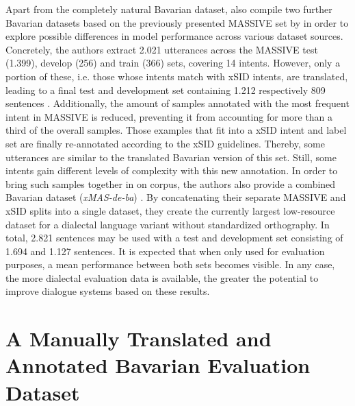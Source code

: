 \documentclass[11pt,a4paper,twoside,openright]{scrbook}
\begin{document}
Apart from the completely natural Bavarian dataset, \citet{winkler-etal-2024-slot-intent} also compile two further Bavarian datasets based on the previously presented MASSIVE set by \citet{fitzgerald-etal-2023-massive} in order to explore possible differences in model performance across various dataset sources. Concretely, the authors extract 2.021 utterances across the MASSIVE test (1.399), develop (256) and train (366) sets, covering 14 intents. However, only a portion of these, i.e. those whose intents match with xSID intents, are translated, leading to a final test and development set containing 1.212 respectively 809 sentences \citep{winkler-etal-2024-slot-intent}. Additionally, the amount of samples annotated with the most frequent intent in MASSIVE is reduced, preventing it from accounting for more than a third of the overall samples. Those examples that fit into a xSID intent and label set are finally re-annotated according to the xSID guidelines. Thereby, some utterances are similar to the translated Bavarian version of this set. Still, some intents gain different levels of complexity with this new annotation. In order to bring such samples together in on corpus, the authors also provide a combined Bavarian dataset (\textit{xMAS-de-ba}) \citep{winkler-etal-2024-slot-intent}. By concatenating their separate MASSIVE and xSID splits into a single dataset, they create the currently largest low-resource dataset for a dialectal language variant without standardized orthography. In total, 2.821 sentences may be used with a test and development set consisting of 1.694 and 1.127 sentences. It is expected that when only used for evaluation purposes, a mean performance between both sets becomes visible. In any case, the more dialectal evaluation data is available, the greater the potential to improve dialogue systems based on these results.







\section{A Manually Translated and Annotated Bavarian Evaluation Dataset}
\end{document}
